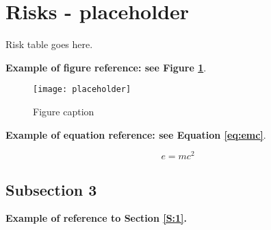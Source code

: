 \section{Risks - placeholder}

Risk table goes here.

\textbf{Example of figure reference: see Figure \ref{fig:example}}. 
\lipsum[5]

\begin{figure}[ht]
\centering\texttt{[image: placeholder]}
\caption{Figure caption}
\label{fig:example}
\end{figure}

\textbf{Example of equation reference: see Equation \eqref{eq:emc}}. 
\lipsum[6]

\begin{equation} 
\label{eq:emc}
e = mc^2
\end{equation}

\subsection{Subsection 3}

\textbf{Example of reference to Section \ref{S:1}.} 
\lipsum[7]
\lipsum[8]